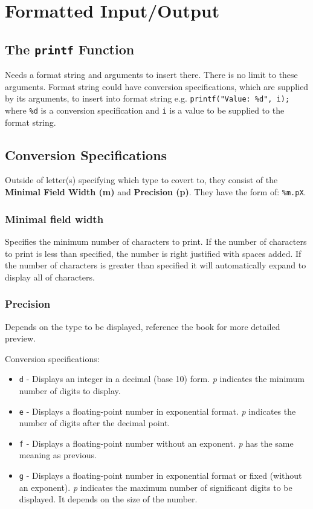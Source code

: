 \documentclass[12pt, openany]{book}
\begin{document}
    \chapter{Formatted Input/Output}

    \section{The \texttt{printf} Function}
    Needs a format string and arguments to insert there. There is no limit to these
    arguments. Format string could have conversion specifications, which are supplied by
    its arguments, to insert into format string e.g. \texttt{printf("Value: \%d", i);}
    where \texttt{\%d} is a conversion specification and \texttt{i} is a value to be
    supplied to the format string.

    \section{Conversion Specifications}
    Outside of letter(s) specifying which type to covert to, they consist of the \textbf{Minimal
    Field Width (m)} and \textbf{Precision (p)}. They have the form of: \texttt{\%m.pX}.

    \subsection*{Minimal field width}
    Specifies the minimum number of characters to print. If the number of characters
    to print is less than specified, the number is right justified with spaces added. If the number of
    characters is greater than specified it will automatically expand to display all of characters.

    \subsection*{Precision}
    Depends on the type to be displayed, reference the book for more detailed preview. 
    \newpage

    Conversion specifications:
    \begin{itemize}
        \item \texttt{d} - Displays an integer in a decimal (base 10) form. \textit{p} indicates
        the minimum number of digits to display.
        \item \texttt{e} - Displays a floating-point number in exponential format. \textit{p}
        indicates the number of digits after the decimal point.
        \item \texttt{f} - Displays a floating-point number without an exponent. \textit{p} has
        the same meaning as previous.
        \item \texttt{g} - Displays a floating-point number in exponential format or
        fixed (without an exponent). \textit{p} indicates the maximum number of
        significant digits to be displayed. It depends on the size of the number.
    \end{itemize}
\end{document}
